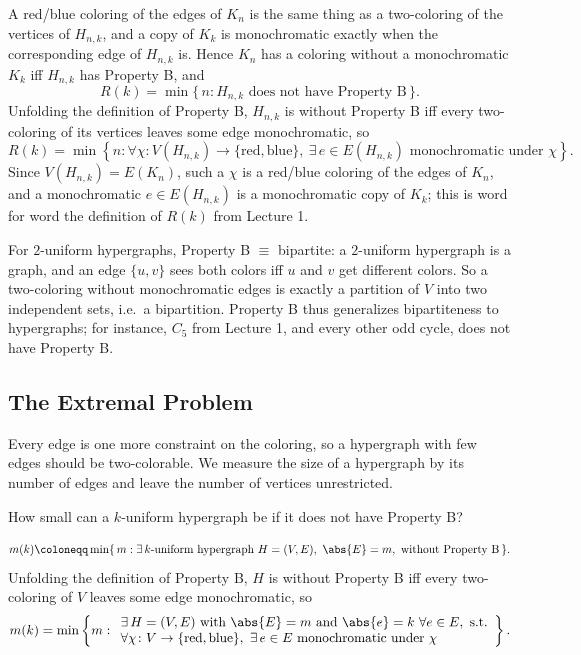 A red/blue coloring of the edges of \(K_n\) is the same thing as a two-coloring of the vertices of \(H_{n,k}\), and a copy of \(K_k\) is monochromatic exactly when the corresponding edge of \(H_{n,k}\) is. Hence \(K_n\) has a coloring without a monochromatic \(K_k\) iff \(H_{n,k}\) has Property B, and
\[
    R(k) = \min \{\, n : H_{n,k} \text{ does not have Property B} \,\}.
\]
Unfolding the definition of Property B, \(H_{n,k}\) is without Property B iff every two-coloring of its vertices leaves some edge monochromatic, so
\[
    R(k) = \min \left\{ n : \forall \chi \colon V(H_{n,k}) \to \{\text{red}, \text{blue}\},\ \exists\, e \in E(H_{n,k}) \text{ monochromatic under } \chi \right\}.
\]
Since \(V(H_{n,k}) = E(K_n)\), such a \(\chi\) is a red/blue coloring of the edges of \(K_n\), and a monochromatic \(e \in E(H_{n,k})\) is a monochromatic copy of \(K_k\); this is word for word the definition of \(R(k)\) from Lecture 1.

\begin{remark}\label{rmk:property-B-bipartite}
    For \(2\)-uniform hypergraphs, Property B \(\equiv\) bipartite: a \(2\)-uniform hypergraph is a graph, and an edge \(\{u, v\}\) sees both colors iff \(u\) and \(v\) get different colors. So a two-coloring without monochromatic edges is exactly a partition of \(V\) into two independent sets, i.e.\ a bipartition. Property B thus generalizes bipartiteness to hypergraphs; for instance, \(C_5\) from Lecture 1, and every other odd cycle, does not have Property B.
\end{remark}

\subsection{The Extremal Problem}

Every edge is one more constraint on the coloring, so a hypergraph with few edges should be two-colorable. We measure the size of a hypergraph by its number of edges and leave the number of vertices unrestricted.

\begin{question}
    How small can a \(k\)-uniform hypergraph be if it does not have Property B?
\end{question}

\begin{definition}
    \[
        m(k) \coloneqq \min \{\, m : \exists\, k\text{-uniform hypergraph } H = (V, E),\ \abs{E} = m,\ \text{without Property B} \,\}.
    \]
    Unfolding the definition of Property B, \(H\) is without Property B iff every two-coloring of \(V\) leaves some edge monochromatic, so
    \[
        m(k) = \min \left\{ m :
        \begin{array}{l}
            \exists\, H = (V, E) \text{ with } \abs{E} = m \text{ and } \abs{e} = k \ \forall e \in E, \text{ s.t.} \\
            \forall \chi \colon V \to \{\text{red}, \text{blue}\},\ \exists\, e \in E \text{ monochromatic under } \chi
        \end{array}
        \right\}.
    \]
\end{definition}

